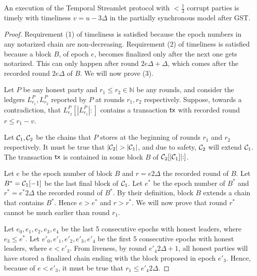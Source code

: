 \begin{theorem}
  An execution of the Temporal Streamlet protocol with $< \frac{1}{3}$ corrupt parties is timely
  with timeliness $v = u - 3 \Delta$ in the partially synchronous model after GST.
\end{theorem}
\begin{proof}
  Requirement (1) of timeliness is satisfied because the epoch numbers in any notarized chain
  are non-decreasing.
  Requirement (2) of timeliness is satisfied because a block $B$, of epoch $e$, becomes finalized
  only after the next one gets notarized. This can only happen after round $2 e \Delta + \Delta$,
  which comes after the recorded round $2 e \Delta$ of $B$.
  We will now prove (3).

  Let $P$ be any honest party and $r_1 \leq r_2 \in \mathbb{N}$ be any rounds, and consider
  the ledgers $L^P_{r_1}, L^P_{r_2}$ reported by $P$ at rounds $r_1, r_2$ respectively.
  Suppose, towards a contradiction, that $L^P_{r_2}[|L^P_{r_1}|{:}]$ contains a transaction
  $\textsf{tx}$ with recorded round $r \leq r_1 - v$.

  Let $\mathcal{C}_1, \mathcal{C}_2$ be the chains that $P$ stores at the beginning of rounds $r_1$
  and $r_2$ respectively.
  It must be true that $|\mathcal{C}_2| > |\mathcal{C}_1|$, and due to safety, $\mathcal{C}_2$ will extend $\mathcal{C}_1$.
  The transaction $\textsf{tx}$ is contained in some block $B$ of $\mathcal{C}_2[|\mathcal{C}_1]|{:}]$.

  Let $e$ be the epoch number of block $B$ and $r = e 2 \Delta$ the recorded round of $B$.
  Let $B^* = \mathcal{C}_1[-1]$ be the last final block of $\mathcal{C}_1$. Let $e^*$ be the epoch
  number of $B^*$ and $r^* = e^* 2 \Delta$ the recorded round of $B^*$.
  By their definition, block $B$ extends a chain that contains $B^*$. Hence
  $e > e^*$ and $r > r^*$.
  We will now prove that round $r^*$ cannot be much earlier than round $r_1$.


  Let $e_0,e_1,e_2,e_3,e_4$ be the last 5 consecutive epochs with honest leaders,
  where $e_3 \leq e^*$. Let $e'_0,e'_1,e'_2,e'_3,e'_4$ be the first 5 consecutive epochs
  with honest leaders, where $e < e'_3$.
  From liveness, by round $e'_4 2 \Delta + 1$, all honest parties will have stored
  a finalized chain ending with the block proposed in epoch $e'_3$. Hence, because
  of $e < e'_3$, it must be true that $r_1 \leq e'_4 2 \Delta$.


\end{proof}
